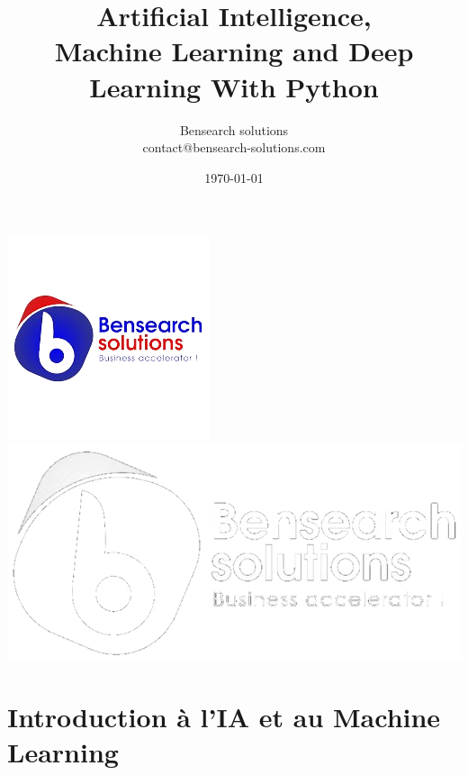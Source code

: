 \documentclass{beamer}
\title{Artificial Intelligence,\\ Machine Learning and Deep Learning With Python}
\author{\color{blue}Bensearch \color{red}solutions\\\color{black} contact@bensearch-solutions.com}
\date{\today}
\begin{document}
	{
	\begin{frame}[plain]
	
		\titlepage
		\includegraphics[scale=0.3]{BensearchLogo-removebg-preview.png}\hfill
			\includegraphics[scale=0.2]{bensearch.png}	
	\end{frame}
}

\section{Introduction à l'IA et au Machine Learning}
\end{document}
